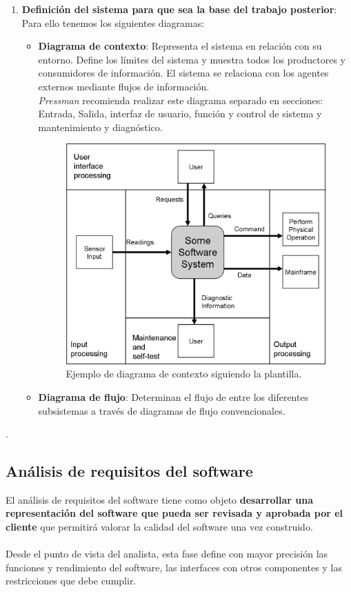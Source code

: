 \begin{enumerate}
    \item \textbf{Definición del sistema para que sea la base del trabajo posterior}: Para ello tenemos los siguientes diagramas:
    \begin{itemize}
        \item \textbf{Diagrama de contexto}: Representa el sistema en relación con su entorno. Define los límites del sistema y muestra todos los productores y consumidores de información. El sistema se relaciona con los agentes externos mediante flujos de información.\\
        \textit{Pressman} recomienda realizar este diagrama separado en secciones: Entrada, Salida, interfaz de usuario, función y control de sistema y mantenimiento y diagnóstico.
        \begin{figure}[H]
        \centering
        \includegraphics[width=0.5\linewidth]{Resources/contextdiagram}
        \caption{Ejemplo de diagrama de contexto siguiendo la plantilla.}
        \label{fig:diagramaDeContexto}
    \end{figure}
        \item \textbf{Diagrama de flujo}: Determinan el flujo de entre los diferentes subsistemas a través de diagramas de flujo convencionales.
    \end{itemize}
\end{enumerate}.


\subsection{Análisis de requisitos del software}

El análisis de requisitos del software tiene como objeto\textbf{ desarrollar una representación del software que pueda ser revisada y aprobada por el cliente} que permitirá valorar la calidad del software una vez construido.
\\\\
Desde el punto de vista del analista, esta fase define con mayor precisión las funciones y rendimiento del software, las interfaces con otros componentes y las restricciones que debe cumplir. 

